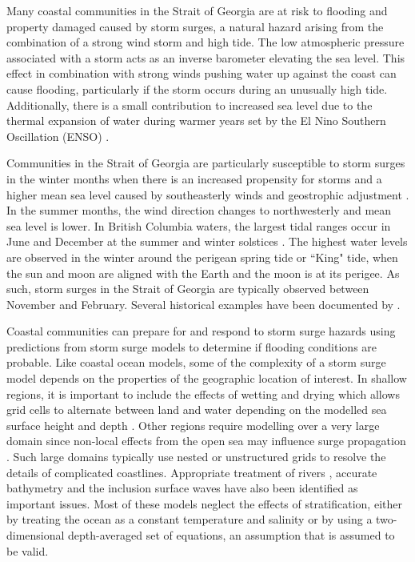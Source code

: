 \documentclass[pdftex,10pt]{article}
\begin{document}
Many coastal communities in the Strait of Georgia are at risk to flooding and property damaged caused by storm surges, a natural hazard arising from the combination of a strong wind storm and high tide. The low atmospheric pressure associated with a storm acts as an inverse barometer elevating the sea level. This effect in combination with strong winds pushing water up against the coast can cause flooding, particularly if the storm occurs during an unusually high tide.  Additionally, there is a small contribution to increased sea level due to the thermal expansion of water during warmer years set by the El Nino Southern Oscillation (ENSO) \citep{abeys2011extreme}.

Communities in the Strait of Georgia are particularly susceptible to storm surges in the winter months when there is an increased propensity for storms and a higher mean sea level caused by southeasterly winds and geostrophic adjustment \citep{danard2003storm}. In the summer months, the wind direction changes to northwesterly and mean sea level is lower. In British Columbia waters, the largest tidal ranges occur in June and December at the summer and winter solstices \citep{thomson1981oceanography}. The highest water levels are observed in the winter around the perigean spring tide or ``King" tide, when the sun and moon are aligned with the Earth and the moon is at its perigee. As such, storm surges in the Strait of Georgia are typically observed between November and February. Several historical examples have been documented by \citet{forseth2006adaptation}. 

Coastal communities can prepare for and respond to storm surge hazards using predictions from storm surge models to determine if flooding conditions are probable. Like coastal ocean models, some of the complexity of a storm surge model depends on the properties of the geographic location of interest. In shallow regions, it is important to include the effects of wetting and drying which allows grid cells to alternate between land and water depending on the modelled sea surface height and depth \citep{hubbert1999storm, weisberg2006hurricane}.  Other regions require modelling over a very large domain since non-local effects from the open sea may influence surge propagation \citep{weisberg2006hurricane, lane2009verification}. Such large domains typically use nested or unstructured grids to resolve the details of complicated coastlines. Appropriate treatment of rivers \citep{flather1994storm}, accurate bathymetry and the inclusion surface waves \citep{xu2010storm} have also been identified as important issues.  Most of these models neglect the effects of stratification, either by treating the ocean as a constant temperature and salinity or by using a two-dimensional depth-averaged set of equations, an assumption that is assumed to be valid. 
\end{document}
